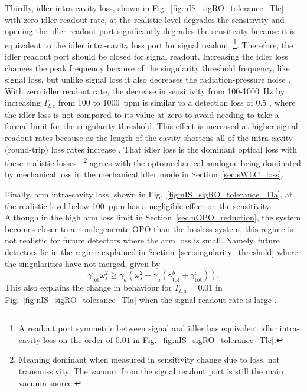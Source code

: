 Thirdly, idler intra-cavity loss, shown in Fig.~\ref{fig:nIS_sigRO_tolerance_Tlc} with zero idler readout rate, at the realistic level degrades the sensitivity and opening the idler readout port significantly degrades  the sensitivity because it is equivalent to the idler intra-cavity loss port for signal readout~\footnote{A readout port symmetric between signal and idler has equivalent idler intra-cavity loss on the order of $0.01$ in Fig.~\ref{fig:nIS_sigRO_tolerance_Tlc}.}. Therefore, the idler readout port should be closed for signal readout. Increasing the idler loss changes the peak frequency because of the singularity threshold frequency, like signal loss, but unlike signal loss it also decreases the radiation-pressure noise . With zero idler readout rate, the decrease in sensitivity from 100-1000~Hz by increasing $T_{l,c}$ from 100 to 1000~ppm is similar to a detection loss of 0.5 , where the idler loss is not compared to its value at zero to avoid needing to take a formal limit for the singularity threshold. This effect is increased at higher signal readout rates because as the length of the cavity shortens all of the intra-cavity (round-trip) loss rates increase . 
That idler loss is the dominant optical loss with these realistic losses ~\footnote{Meaning dominant when measured in sensitivity change due to loss, not transmissivity. The vacuum from the signal readout port is still the main vacuum source.} agrees with the optomechanical analogue being dominated by mechanical loss in the mechanical idler mode in Section~\ref{sec:sWLC_loss}.

Finally, arm intra-cavity loss, shown in Fig.~\ref{fig:nIS_sigRO_tolerance_Tla}, at the realistic level below 100~ppm has a negligible  effect on the sensitivity. Although in the high arm loss limit in Section~\ref{sec:nOPO_reduction}, the system becomes closer to a nondegenerate OPO than the lossless system, this regime is not realistic for future detectors where the arm loss is small. Namely, future detectors lie in the regime explained in Section~\ref{sec:singularity_threshold} where the singularities have not merged, given by $$\gamma^c_\text{tot}\omega_s^2\geq\gamma_a\left(\omega_s^2+\gamma_a(\gamma^b_\mathrm{tot}+\gamma^c_\text{tot})\right).$$ This also explains the change in behaviour for $T_{l,a}=0.01$ in Fig.~\ref{fig:nIS_sigRO_tolerance_Tla} when the signal readout rate is large .

